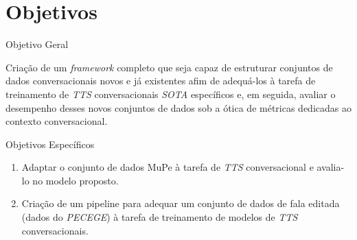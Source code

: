 \section{Objetivos}

\begin{frame}{Objetivo Geral}
  \begin{block}{}
    Criação de um \textit{framework} completo que seja capaz de estruturar conjuntos de
    dados conversacionais novos e já existentes afim de adequá-los à tarefa de
    treinamento de \textit{TTS} conversacionais \textit{SOTA} específicos e, em seguida,
    avaliar o desempenho desses novos conjuntos de dados sob a ótica de métricas
    dedicadas ao contexto conversacional.
  \end{block}
\end{frame}

\begin{frame}{Objetivos Específicos}
  \begin{block}{}
    \begin{enumerate}
      \item[1] Adaptar o conjunto de dados MuPe\cite{evaldo-leal-etal-2025-mupe} à tarefa
        de \textit{TTS} conversacional e avalia-lo no modelo proposto.
      \item[2] Criação de um pipeline para adequar um conjunto de dados de fala editada
        (dados do \textit{PECEGE}) à tarefa de treinamento de modelos de \textit{TTS}
        conversacionais.
    \end{enumerate}
  \end{block}
\end{frame}
